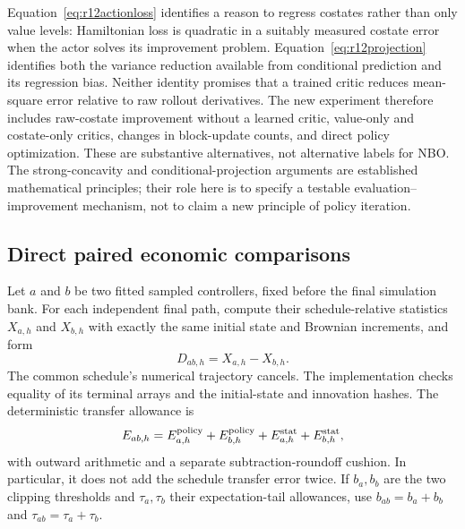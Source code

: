 Equation~\eqref{eq:r12actionloss} identifies a reason to regress costates rather than only value levels: Hamiltonian loss is quadratic in a suitably measured costate error when the actor solves its improvement problem. Equation~\eqref{eq:r12projection} identifies both the variance reduction available from conditional prediction and its regression bias. Neither identity promises that a trained critic reduces mean-square error relative to raw rollout derivatives. The new experiment therefore includes raw-costate improvement without a learned critic, value-only and costate-only critics, changes in block-update counts, and direct policy optimization. These are substantive alternatives, not alternative labels for NBO. The strong-concavity and conditional-projection arguments are established mathematical principles; their role here is to specify a testable evaluation--improvement mechanism, not to claim a new principle of policy iteration.



\subsection{Direct paired economic comparisons}
Let $a$ and $b$ be two fitted sampled controllers, fixed before the final simulation bank. For each independent final path, compute their schedule-relative statistics $X_{a,h}$ and $X_{b,h}$ with exactly the same initial state and Brownian increments, and form
\[
 D_{ab,h}=X_{a,h}-X_{b,h}.
\]
The common schedule's numerical trajectory cancels. The implementation checks equality of its terminal arrays and the initial-state and innovation hashes. The deterministic transfer allowance is
\[
 E_{ab,h}=E_{a,h}^{\rm policy}+E_{b,h}^{\rm policy}
              +E_{a,h}^{\rm stat}+E_{b,h}^{\rm stat},
\]
with outward arithmetic and a separate subtraction-roundoff cushion. In particular, it does not add the schedule transfer error twice. If $b_a,b_b$ are the two clipping thresholds and $\tau_a,\tau_b$ their expectation-tail allowances, use $b_{ab}=b_a+b_b$ and $\tau_{ab}=\tau_a+\tau_b$.

